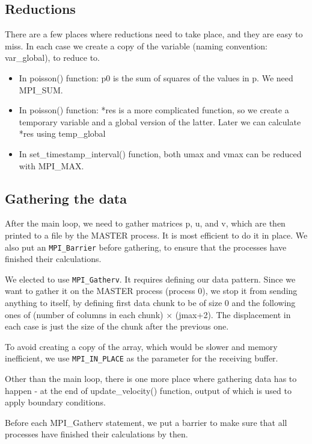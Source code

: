 \documentclass[11pt,journal]{article}
\begin{document}
	\subsection{Reductions}
	There are a few places where reductions need to take place, and they are easy to miss. In each case we create a copy of the variable (naming convention: var\_global), to reduce to.
	 \begin{itemize}
	 	\item In poisson() function: p0 is the sum of squares of the values in p. We need MPI\_SUM.
	 	\item In poisson() function: *res is a more complicated function, so we create a temporary variable and a global version of the latter. Later we can calculate *res using temp\_global
	 	\item In set\_timestamp\_interval() function, both umax and vmax can be reduced with MPI\_MAX.
	 \end{itemize}
 

	
	\subsection{Gathering the data}
	After the main loop, we need to gather matrices p, u, and v, which are then printed to a file by the MASTER process. It is most efficient to do it in place. We also put an \texttt{MPI\_Barrier} before gathering, to ensure that the processes have finished their calculations.
	
	We elected to use \texttt{MPI\_Gatherv}. It requires defining our data pattern. Since we want to gather it on the MASTER process (process 0), we stop it from sending anything to itself, by defining first data chunk to be of size 0 and the following ones of (number of columns in each chunk) $\times$ (jmax+2). The displacement in each case is just the size of the chunk after the previous one.
	
	To avoid creating a copy of the array, which would be slower and memory inefficient, we use \texttt{MPI\_IN\_PLACE} as the parameter for the receiving buffer. 

	Other than the main loop, there is one more place where gathering data has to happen - at the end of update\_velocity() function, output of which is used to apply boundary conditions.
	
	Before each MPI\_Gatherv statement, we put a barrier to make sure that all processes have finished their calculations by then.
	
\end{document}

